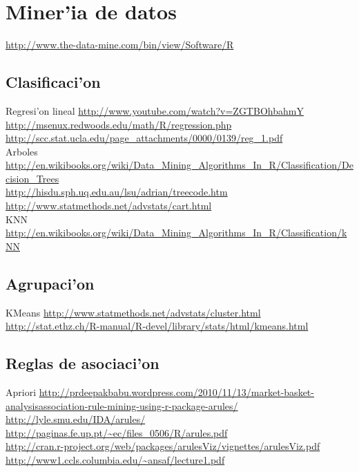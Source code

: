 \chapter{Miner'ia de datos}

\url{http://www.the-data-mine.com/bin/view/Software/R}

\section{Clasificaci'on}
Regresi'on lineal \url{http://www.youtube.com/watch?v=ZGTBOhbahmY}\\
\url{http://msenux.redwoods.edu/math/R/regression.php}\\
\url{http://scc.stat.ucla.edu/page_attachments/0000/0139/reg_1.pdf}\\

Arboles \url{http://en.wikibooks.org/wiki/Data_Mining_Algorithms_In_R/Classification/Decision_Trees}\\
\url{http://hisdu.sph.uq.edu.au/lsu/adrian/treecode.htm}\\
\url{http://www.statmethods.net/advstats/cart.html}\\

KNN \url{http://en.wikibooks.org/wiki/Data_Mining_Algorithms_In_R/Classification/kNN}


\section{Agrupaci'on}
KMeans \url{http://www.statmethods.net/advstats/cluster.html}\\
\url{http://stat.ethz.ch/R-manual/R-devel/library/stats/html/kmeans.html}\\
\section{Reglas de asociaci'on}

Apriori \url{http://prdeepakbabu.wordpress.com/2010/11/13/market-basket-analysisassociation-rule-mining-using-r-package-arules/}\\
\url{http://lyle.smu.edu/IDA/arules/}\\
\url{http://paginas.fe.up.pt/~ec/files_0506/R/arules.pdf}\\
\url{http://cran.r-project.org/web/packages/arulesViz/vignettes/arulesViz.pdf}\\
\url{http://www1.ccls.columbia.edu/~ansaf/lecture1.pdf}\\
